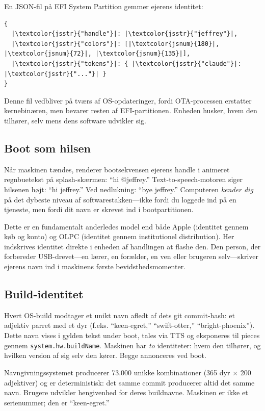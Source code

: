 \documentclass[10pt,letterpaper,twocolumn]{article}
\begin{document}
En JSON-fil på EFI System Partition gemmer ejerens identitet:

\begin{lstlisting}[style=acjsstyle]
{
  |\textcolor{jsstr}{"handle"}|: |\textcolor{jsstr}{"jeffrey"}|,
  |\textcolor{jsstr}{"colors"}|: [|\textcolor{jsnum}{180}|, |\textcolor{jsnum}{72}|, |\textcolor{jsnum}{135}|],
  |\textcolor{jsstr}{"tokens"}|: { |\textcolor{jsstr}{"claude"}|: |\textcolor{jsstr}{"..."}| }
}
\end{lstlisting}

Denne fil vedbliver på tværs af OS-opdateringer, fordi OTA-processen erstatter kernebinæren, men bevarer resten af EFI-partitionen. Enheden husker, hvem den tilhører, selv mens dens software udvikler sig.

\subsection{Boot som hilsen}

Når maskinen tændes, renderer bootsekvensen ejerens handle i animeret regnbuetekst på splash-skærmen: ``hi @jeffrey.'' Text-to-speech-motoren siger hilsenen højt: ``hi jeffrey.'' Ved nedlukning: ``bye jeffrey.'' Computeren \emph{kender dig} på det dybeste niveau af softwarestakken---ikke fordi du loggede ind på en tjeneste, men fordi dit navn er skrevet ind i bootpartitionen.

Dette er en fundamentalt anderledes model end både Apple (identitet gennem køb og konto) og OLPC (identitet gennem institutionel distribution). Her indskrives identitet direkte i enheden af handlingen at flashe den. Den person, der forbereder USB-drevet---en lærer, en forælder, en ven eller brugeren selv---skriver ejerens navn ind i maskinens første bevidsthedsmomenter.

\subsection{Build-identitet}

Hvert OS-build modtager et unikt navn afledt af dets git commit-hash: et adjektiv parret med et dyr (f.eks. ``keen-egret,'' ``swift-otter,'' ``bright-phoenix''). Dette navn vises i gylden tekst under boot, tales via TTS og eksponeres til pieces gennem \texttt{system.hw.buildName}. Maskinen har \emph{to} identiteter: hvem den tilhører, og hvilken version af sig selv den kører. Begge annonceres ved boot.

Navngivningssystemet producerer 73.000 unikke kombinationer (365 dyr $\times$ 200 adjektiver) og er deterministisk: det samme commit producerer altid det samme navn. Brugere udvikler hengivenhed for deres buildnavne. Maskinen er ikke et serienummer; den er ``keen-egret.''
\end{document}
